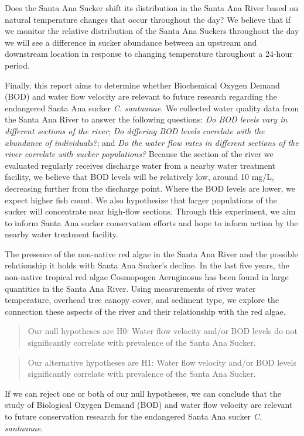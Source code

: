 \documentclass{article}\usepackage[]{graphicx}\usepackage[]{color}
\begin{document}
Does the Santa Ana Sucker shift its distribution in the Santa Ana River based on natural temperature changes that occur throughout the day? We believe that if we monitor the relative distribution of the Santa Ana Suckers throughout the day we will see a difference in sucker abundance between an upstream and downstream location in response to changing temperature throughout a 24-hour period.

Finally, this report aims to determine whether Biochemical Oxygen Demand (BOD) and water flow velocity are relevant to future research regarding the endangered Santa Ana sucker \emph{C. santaanae}. We collected water quality data from the Santa Ana River to answer the following questions: \emph{Do BOD levels vary in different sections of the river}; \emph{Do differing BOD levels correlate with the abundance of individuals?}; and \emph{Do the water flow rates in different sections of the river correlate with sucker populations?} Because the section of the river we evaluated regularly receives discharge water from a nearby water treatment facility, we believe that BOD levels will be relatively low, around 10 mg/L, decreasing further from the discharge point. Where the BOD levels are lower, we expect higher fish count. We also hypothesize that larger populations of the sucker will concentrate near high-flow sections. Through this experiment, we aim to inform Santa Ana sucker conservation efforts and hope to inform action by the nearby water treatment facility. 

The presence of the non-native red algae in the Santa Ana River and the possible relationship it holds with Santa Ana Sucker's decline. In the last five years, the non-native tropical red algae Cosmopogen Aeruginosus has been found in large quantities in the Santa Ana River. Using measurements of river water temperature, overhead tree canopy cover, and sediment type, we explore the connection these aspects of the river and their relationship with the red algae.

\begin{quote}
Our null hypotheses are H0: Water flow velocity and/or BOD levels do not significantly correlate with prevalence of the Santa Ana Sucker.
\end{quote}
\begin{quote}
Our alternative hypotheses are H1: Water flow velocity and/or BOD levels significantly correlate with prevalence of the Santa Ana Sucker.
\end{quote}
If we can reject one or both of our null hypotheses, we can conclude that the study of Biological Oxygen Demand (BOD) and water flow velocity are relevant to future conservation research for the endangered Santa Ana sucker \emph{C. santaanae}.
\end{document}
